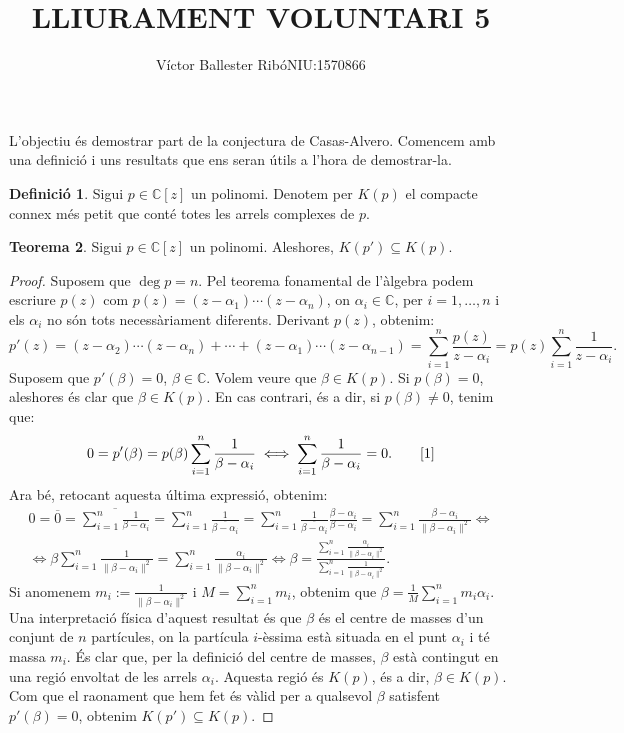 \documentclass[11pt,a4paper]{article}
\title{\bfseries\large LLIURAMENT VOLUNTARI 5}
\author{Víctor Ballester Ribó\endgraf NIU:1570866}
\date{\parbox{\linewidth}{\centering
  Mètodes numèrics\endgraf
  Grau en Matemàtiques\endgraf
  Universitat Autònoma de Barcelona\endgraf
  Maig de 2021}}
\theoremstyle{definition}
\newtheorem{theorem}{Teorema}
\newtheorem{definition}[theorem]{Definició}
\newcommand{\CC}{\ensuremath{\mathbb{C}}}
\begin{document}
\maketitle
L'objectiu és demostrar part de la conjectura de Casas-Alvero. Comencem amb una definició i uns resultats que ens seran útils a l'hora de demostrar-la.
\begin{definition}
    Sigui $p\in\CC[z]$ un polinomi. Denotem per $K(p)$ el compacte connex més petit que conté totes les arrels complexes de $p$.
\end{definition}
\begin{theorem}
    Sigui $p\in\CC[z]$ un polinomi. Aleshores, $K(p')\subseteq K(p)$.
\end{theorem}
\begin{proof}
    Suposem que $\deg p=n$. Pel teorema fonamental de l'àlgebra podem escriure $p(z)$ com $p(z)=(z-\alpha_1)\cdots(z-\alpha_n)$, on $\alpha_i\in\CC$, per $i=1,\ldots,n$ i els $\alpha_i$ no són tots necessàriament diferents. Derivant $p(z)$, obtenim:
    $$p'(z)=(z-\alpha_2)\cdots(z-\alpha_n)+\cdots+(z-\alpha_1)\cdots(z-\alpha_{n-1})=\sum_{i=1}^n\frac{p(z)}{z-\alpha_i}=p(z)\sum_{i=1}^n\frac{1}{z-\alpha_i}.$$
    Suposem que $p'(\beta)=0$, $\beta\in\CC$. Volem veure que $\beta\in K(p)$. Si $p(\beta)=0$, aleshores és clar que $\beta\in K(p)$. En cas contrari, és a dir, si $p(\beta)\ne 0$, tenim que:
    $$0=p'(\beta)=p(\beta)\sum_{i=1}^n\frac{1}{\beta-\alpha_i}\iff\sum_{i=1}^n\frac{1}{\beta-\alpha_i}=0.\qquad\text{\cite{1}}$$
    Ara bé, retocant aquesta última expressió, obtenim:
    \begin{multline*}
        0=\overline{0}=\overline{\sum_{i=1}^n\frac{1}{\beta-\alpha_i}}=\sum_{i=1}^n\frac{1}{\overline{\beta-\alpha_i}}=\sum_{i=1}^n\frac{1}{\overline{\beta-\alpha_i}}\frac{\beta-\alpha_i}{\beta-\alpha_i}=\sum_{i=1}^n\frac{\beta-\alpha_i}{\|\beta-\alpha_i\|^2}\iff\\\iff\beta\sum_{i=1}^n\frac{1}{\|\beta-\alpha_i\|^2}=\sum_{i=1}^n\frac{\alpha_i}{\|\beta-\alpha_i\|^2}\iff\beta=\frac{\sum_{i=1}^n\frac{\alpha_i}{\|\beta-\alpha_i\|^2}}{\sum_{i=1}^n\frac{1}{\|\beta-\alpha_i\|^2}}.
    \end{multline*}
    Si anomenem $m_i:=\frac{1}{\|\beta-\alpha_i\|^2}$ i $M=\sum_{i=1}^nm_i$, obtenim que $\beta=\frac{1}{M}\sum_{i=1}^nm_i\alpha_i$. Una interpretació física d'aquest resultat és que $\beta$ és el centre de masses d'un conjunt de $n$ partícules, on la partícula $i$-èssima està situada en el punt $\alpha_i$ i té massa $m_i$. És clar que, per la definició del centre de masses, $\beta$ està contingut en una regió envoltat de les arrels $\alpha_i$. Aquesta regió és $K(p)$, és a dir, $\beta\in K(p)$. Com que el raonament que hem fet és vàlid per a qualsevol $\beta$ satisfent $p'(\beta)=0$, obtenim $K(p')\subseteq K(p)$.
\end{proof}
\end{document}
